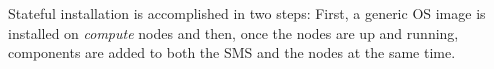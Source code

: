 Stateful  installation is accomplished in two steps: First,  a generic OS
image is installed on {\em compute} nodes and then, once the nodes are up
and running, \OHPC{} components are added to both the SMS and the nodes at the
same time.
